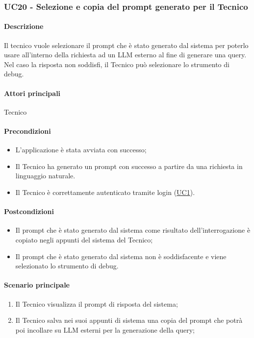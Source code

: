 \subsubsection{UC20 - Selezione e copia del prompt generato per il Tecnico}\label{UC8}

\paragraph*{Descrizione}
Il tecnico vuole selezionare il prompt che è stato generato dal sistema per poterlo usare all’interno della richiesta ad un LLM esterno al fine di generare una query. Nel caso la risposta non soddisfi, il Tecnico può selezionare lo strumento di debug.

\paragraph*{Attori principali}
Tecnico

\paragraph*{Precondizioni}
\begin{itemize}
  \item L'applicazione è stata avviata con successo;
  \item Il Tecnico ha generato un prompt con successo a partire da una richiesta in linguaggio naturale.
  \item Il Tecnico è correttamente autenticato tramite login (\hyperref[UC1]{UC1}). %
\end{itemize}

\paragraph*{Postcondizioni}
\begin{itemize}
  \item Il prompt che è stato generato dal sistema come risultato dell’interrogazione è copiato negli appunti del sistema del Tecnico;
  \item Il prompt che è stato generato dal sistema non è soddisfacente e viene selezionato lo strumento di debug.
\end{itemize}

\paragraph*{Scenario principale}
\begin{enumerate}
  \item Il Tecnico visualizza il prompt di risposta del sistema;
  \item Il Tecnico salva nei suoi appunti di sistema una copia del prompt che potrà poi incollare su LLM esterni per la generazione della query;
\end{enumerate}

